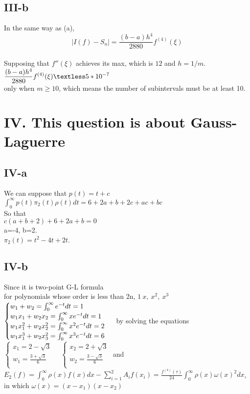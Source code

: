 \documentclass[twoside,a4paper]{article}
\begin{document}
\subsection*{III-b}
In the same way as (a), \\
$$|I(f)-S_n|=\displaystyle\frac{(b-a)h^4}{2880}f^{(4)}(\xi) $$\\
Supposing that $f''(\xi)$ achieves its max, which is $12$ and $h=1/m$.\\
$\displaystyle\frac{(b-a)h^4}{2880}f^{(4)}(\xi)\textless 5*10^{-7}$\\
only when $m \ge 10$, which means the number of subintervals must be at least 10.\\
\section*{IV. This question is about Gauss-Laguerre}
\subsection*{IV-a}
We can suppose that $p(t)=t+c$ \\$
\int_{0}^{\infty} p(t) \pi _2(t) \rho(t) dt=6+2a+b+2c+ac+bc$\\
So that \\
$c(a+b+2)+6+2a+b=0$\\
a=-4, b=2.\\
$\pi_2(t)=t^2-4t+2t$.\\
\subsection*{IV-b}
Since it is two-point G-L formula\\
for polynomials whose order is less than 2n, $1 \ x, \ x^2, \ x^3$\\ 
$
\begin{cases}
w_1+w_2= \int_{0}^{\infty} e^{-t} dt=1\\
w_1 x_1+w_2 x_2=\int_{0}^{\infty} x e^{-t} dt =1 \\
w_1 x^2 _1+w_2 x^2 _2 =\int_{0}^{\infty} x^2 e^{-t} dt=2 \\
w_1 x^3 _1+w_2 x^2 _3 =\int_{0}^{\infty} x^3 e^{-t} dt=6\\
\end{cases}\\
$
by solving the equations\\
$
\begin{cases}
x_1=2-\sqrt{3}\\
w_1=\frac{3+\sqrt{3}}{6}\\
\end{cases}
\quad
\begin{cases}
x_2=2+\sqrt{3}\\
w_2=\frac{3-\sqrt{3}}{6}\\
\end{cases}
$
and \\
$E_2(f)= \int_{0}^{\infty} \rho(x) f(x) dx -\sum_{i=1}^{2} A_i f(x_i)=\frac{f^{(4)}(\tau)}{24} \int_{0}^{\infty} \rho(x) \omega(x) ^2 dx$, in which $\omega(x)=(x-x_1)(x-x_2)$\\
\end{document}
